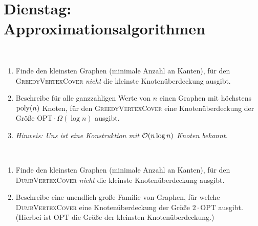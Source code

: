 \documentclass{uebung_cs}
\begin{document}
\section*{Dienstag: Approximationsalgorithmen}

\begin{exercise}\
	\begin{enumerate}
		\item\easy Finde den kleinsten Graphen (minimale Anzahl an Kanten), für den \textsc{GreedyVertexCover} \emph{nicht} die kleinste Knotenüberdeckung ausgibt.
		\item\hard Beschreibe für alle ganzzahligen Werte von $n$ einen Graphen mit höchstens $\operatorname{poly}(n)$ Knoten, für den \textsc{GreedyVertexCover} eine Knotenüberdeckung der Größe $\mathrm{OPT} \cdot \Omega(\log n)$ ausgibt.
		\item[] \textit{Hinweis: Uns ist eine Konstruktion mit $\mathcal{O}(n \log n)$ Knoten bekannt.}
	\end{enumerate}

\end{exercise}

\begin{exercise}[Dummes Vertex-Cover][\href{https://moodle.studiumdigitale.uni-frankfurt.de/moodle/mod/assign/view.php?id=245924}{Moodle}\athome]\
	\begin{enumerate}
		\item\easy Finde den kleinsten Graphen (minimale Anzahl an Kanten), für den \textsc{DumbVertexCover} \emph{nicht} die kleinste Knotenüberdeckung ausgibt.
		\item\medium Beschreibe eine unendlich große Familie von Graphen, für welche \textsc{DumbVertexCover} eine Knotenüberdeckung der Größe $2 \cdot \mathrm{OPT}$ ausgibt.
		      (Hierbei ist $\mathrm{OPT}$ die Größe der kleinsten Knotenüberdeckung.)
	\end{enumerate}
\end{exercise}
\end{document}
